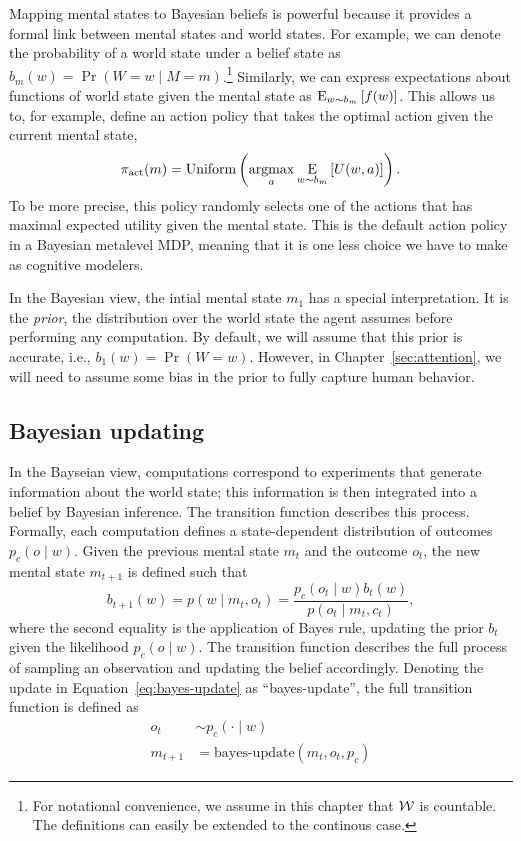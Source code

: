Mapping mental states to Bayesian beliefs is powerful because it provides a formal link between mental states and world states. For example, we can denote the probability of a world state under a belief state as $b_m(w) = \Pr(W = w \mid M = m)$.\footnote{%
  For notational convenience, we assume in this chapter that $\W$ is countable. The definitions can easily be extended to the continous case.
} Similarly, we can express expectations about functions of world state given the mental state as $\expectunder{f(w)}{w \sim b_m}$. This allows us to, for example, define an action policy that takes the optimal action given the current mental state,
\begin{equation}
  \pi\act(m) = \Uniform \left(\argmax_a \expectunder{U(w, a)}{w \sim b_m}\right).
\end{equation}
%
To be more precise, this policy randomly selects one of the actions that has maximal expected utility given the mental state. This is the default action policy in a Bayesian metalevel MDP, meaning that it is one less choice we have to make as cognitive modelers.

In the Bayesian view, the intial mental state $m_1$ has a special interpretation. It is the \emph{prior}, the distribution over the world state the agent assumes before performing any computation. By default, we will assume that this prior is accurate, i.e., $b_1(w) = \Pr(W=w)$. However, in Chapter~\ref{sec:attention}, we will need to assume some bias in the prior to fully capture human behavior.

\subsection{Bayesian updating}

In the Bayseian view, computations correspond to experiments that generate information about the world state; this information is then integrated into a belief by Bayesian inference. The transition function describes this process. Formally, each computation defines a state-dependent distribution of outcomes $p_c(o \mid w)$. Given the previous mental state $m_t$ and the outcome $o_t$, the new mental state $m_{t+1}$ is defined such that
%
\begin{equation}\label{eq:bayes-update}
  b_{t+1}(w) = p(w \mid m_t, o_t) = \frac{
    p_c(o_t \mid w) b_t(w) 
  }{
    p(o_t \mid m_t, c_t)
  },
\end{equation}
%
where the second equality is the application of Bayes rule, updating the prior $b_t$ given the likelihood $p_c(o \mid w)$. The transition function describes the full process of sampling an observation and updating the belief accordingly. Denoting the update in Equation~\ref{eq:bayes-update} as ``bayes-update'', the full transition function is defined as
%
\begin{equation}\label{eq:bayes-transition}
\begin{aligned}
  o_t &\sim p_c(\cdot \mid w) \\
  m_{t+1} &= \text{bayes-update}(m_t, o_t, p_c)
\end{aligned}
\end{equation}

